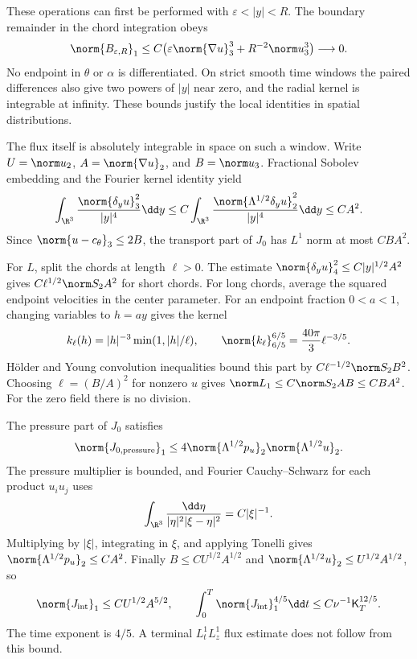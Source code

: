 These operations can first be performed with
\(\varepsilon<|y|<R\). The boundary remainder in the chord integration
obeys
\[
 \norm{B_{\varepsilon,R}}_1
 \le C\bigl(\varepsilon\norm{\nabla u}_3^3
                 +R^{-2}\norm u_3^3\bigr)\longrightarrow0.
\]
No endpoint in \(\theta\) or \(\alpha\) is differentiated.
On strict smooth time windows the paired differences also give two
powers of \(|y|\) near zero, and the radial kernel is integrable at
infinity. These bounds justify the local identities in spatial
distributions.

The flux itself is absolutely integrable in space on such a window.
Write \(U=\norm u_2\), \(A=\norm{\nabla u}_2\), and \(B=\norm u_3\).
Fractional Sobolev embedding and the Fourier kernel identity yield
\[
 \int_{\R^3}\frac{\norm{\delta_yu}_3^2}{|y|^4}\dd y
 \le C\int_{\R^3}
 \frac{\norm{\Lambda^{1/2}\delta_yu}_2^2}{|y|^4}\dd y
 \le CA^2.
\]
Since \(\norm{u-c_\theta}_3\le2B\), the transport part of \(J_0\)
has \(L^1\) norm at most \(CBA^2\).

For \(L\), split the chords at length \(\ell>0\).
The estimate
\(\norm{\delta_yu}_4^2\le C|y|^{1/2}A^2\) gives
\(C\ell^{1/2}\norm S_2A^2\) for short chords.
For long chords, average the squared endpoint velocities in the center
parameter. For an endpoint fraction \(0<a<1\), changing variables to
\(h=ay\) gives the kernel
\[
 k_\ell(h)=|h|^{-3}\min(1,|h|/\ell),\qquad
 \norm{k_\ell}_{6/5}^{6/5}=\frac{40\pi}{3}\ell^{-3/5}.
\]
H\"older and Young convolution inequalities bound this part by
\(C\ell^{-1/2}\norm S_2B^2\).
Choosing \(\ell=(B/A)^2\) for nonzero \(u\) gives
\(\norm L_1\le C\norm S_2AB\le CBA^2\).
For the zero field there is no division.

The pressure part of \(J_0\) satisfies
\[
 \norm{J_{0,\mathrm{pressure}}}_1
 \le4\norm{\Lambda^{1/2}p_u}_2\norm{\Lambda^{1/2}u}_2.
\]
The pressure multiplier is bounded, and Fourier Cauchy--Schwarz for
each product \(u_i u_j\) uses
\[
 \int_{\R^3}\frac{\dd\eta}{|\eta|^2|\xi-\eta|^2}
 =C|\xi|^{-1}.
\]
Multiplying by \(|\xi|\), integrating in \(\xi\), and applying Tonelli
gives \(\norm{\Lambda^{1/2}p_u}_2\le CA^2\).
Finally \(B\le CU^{1/2}A^{1/2}\) and
\(\norm{\Lambda^{1/2}u}_2\le U^{1/2}A^{1/2}\), so
\begin{equation}
 \norm{J_{\mathrm{int}}}_1\le CU^{1/2}A^{5/2},\qquad
 \int_0^T\norm{J_{\mathrm{int}}}_1^{4/5}\dd t
 \le C\nu^{-1}\mathsf K_T^{12/5}.
 \label{r:crd-eq:flux-budget}
\end{equation}
The time exponent is \(4/5\). A terminal \(L^1_tL^1_z\) flux estimate
does not follow from this bound.

